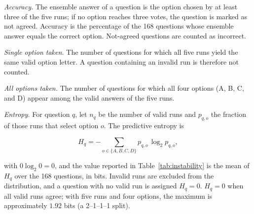 \documentclass[conference]{IEEEtran}
\begin{document}
\textit{Accuracy.} The ensemble answer of a question is the option chosen by at least three of the five runs; if no option reaches three votes, the question is marked as not agreed. Accuracy is the percentage of the 168 questions whose ensemble answer equals the correct option. Not-agreed questions are counted as incorrect.

\textit{Single option taken.} The number of questions for which all five runs yield the same valid option letter. A question containing an invalid run is therefore not counted.

\textit{All options taken.} The number of questions for which all four options (A, B, C, and D) appear among the valid answers of the five runs.

\textit{Entropy.} For question $q$, let $n_q$ be the number of valid runs and $p_{q,o}$ the fraction of those runs that select option $o$. The predictive entropy is

\[
H_q = -\sum_{o\in\{A,B,C,D\}} p_{q,o}\,\log_2 p_{q,o},
\]

with $0\log_2 0 = 0$, and the value reported in Table~\ref{tab:instability} is the mean of $H_q$ over the 168 questions, in bits. Invalid runs are excluded from the distribution, and a question with no valid run is assigned $H_q=0$. $H_q=0$ when all valid runs agree; with five runs and four options, the maximum is approximately $1.92$ bits (a 2--1--1--1 split).
\end{document}
